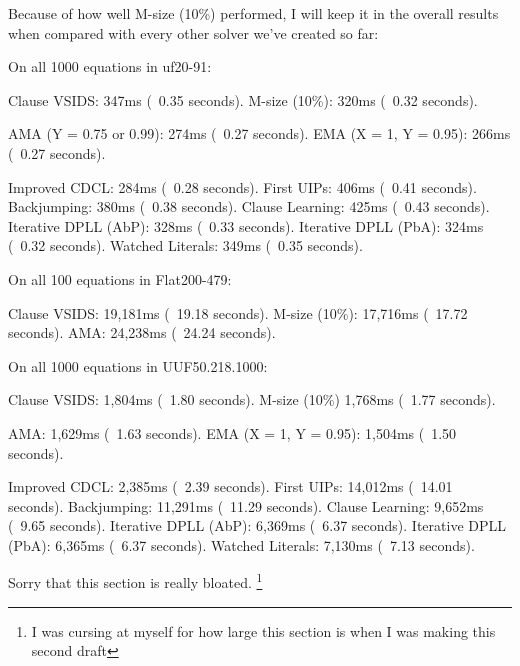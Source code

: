 Because of how well M-size (10\%) performed, I will keep it in the overall results 
when compared with every other solver we've created so far:

\begin{FVerbatim}
On all 1000 equations in uf20-91:

Clause VSIDS:               347ms (~0.35 seconds).
M-size (10\%):              320ms (~0.32 seconds).

AMA (Y = 0.75 or 0.99):     274ms (~0.27 seconds).
EMA (X = 1, Y = 0.95):      266ms (~0.27 seconds).

Improved CDCL:              284ms (~0.28 seconds).
First UIPs:                 406ms (~0.41 seconds).
Backjumping:                380ms (~0.38 seconds).
Clause Learning:            425ms (~0.43 seconds).
Iterative DPLL (AbP):       328ms (~0.33 seconds).
Iterative DPLL (PbA):       324ms (~0.32 seconds).
Watched Literals:           349ms (~0.35 seconds).

On all 100 equations in Flat200-479:

Clause VSIDS:               19,181ms (~19.18 seconds).
M-size (10\%):              17,716ms (~17.72 seconds).
AMA:                        24,238ms (~24.24 seconds).

On all 1000 equations in UUF50.218.1000:

Clause VSIDS:               1,804ms (~1.80 seconds).
M-size (10\%)               1,768ms (~1.77 seconds).

AMA:                        1,629ms (~1.63 seconds).
EMA (X = 1, Y = 0.95):      1,504ms (~1.50 seconds).

Improved CDCL:              2,385ms (~2.39 seconds).
First UIPs:                 14,012ms (~14.01 seconds).
Backjumping:                11,291ms (~11.29 seconds).
Clause Learning:            9,652ms (~9.65 seconds).
Iterative DPLL (AbP):       6,369ms (~6.37 seconds).
Iterative DPLL (PbA):       6,365ms (~6.37 seconds).
Watched Literals:           7,130ms (~7.13 seconds).
\end{FVerbatim}
\noindent
Sorry that this section is really bloated.
\footnote{I was cursing at myself for how large this section is when I was making this second draft}